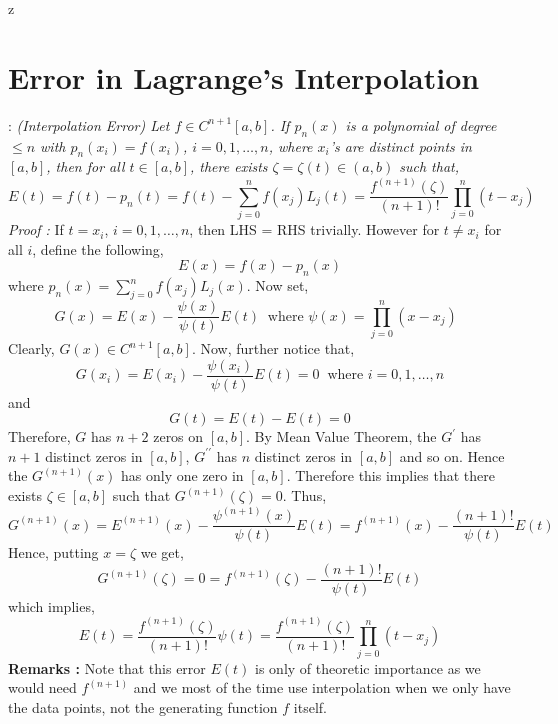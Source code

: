 z\documentclass[a4paper,12pt,twoside]{book}
\newcommand{\nll}[0]{\newline\newline}
\newcommand{\tit}[1]{\textit{#1}}
\newcommand{\theor}[1]{\boxed{\textbf{\textit{Theorem \thechapter.#1}}}}
\begin{document}
\section{Error in Lagrange's Interpolation}
\theor{6}  : \tit{(Interpolation Error) Let $f\in C^{n+1}[a,b]$. If $p_n(x)$ is a polynomial of degree $\le n$ with $p_n(x_i) = f(x_i)$, $i = 0,1,\dots,n$, where $x_i$'s are distinct points in $[a,b]$, then for all $t \in [a,b]$, there exists $\zeta = \zeta(t) \in (a,b)$ such that,
\[ E(t) = f(t) - p_n(t) = f(t) - \sum_{j=0}^{n}f(x_j)L_j(t) = \boxed{\frac{f^{(n+1)}(\zeta)}{(n+1)!} \prod_{j=0}^{n}(t-x_j)} \]
}
\tit{Proof : }If $t = x_i$, $i=0,1,\dots,n$, then LHS = RHS trivially. However for $t \neq x_i$ for all $i$, define the following,
\[ E(x) = f(x) - p_n(x)\]
where $p_n(x) = \sum_{j=0}^nf(x_j)L_j(x)$.
\nll
Now set,
\[ G(x) = E(x) - \frac{\psi(x)}{\psi(t)}E(t) \;\;\text{where } \psi(x) = \prod_{j=0}^n (x-x_j)\;\;\]
Clearly, $G(x) \in C^{n+1}[a,b]$.
\nll
Now, further notice that,
\[ G(x_i) = E(x_i) - \frac{\psi(x_i)}{\psi(t)}E(t) = 0 \;\;\text{where }i=0,1,\dots,n\]
and 
\[ G(t) =  E(t) - E(t) = 0\]
Therefore, $G$ has $n+2$ zeros on $[a,b]$. By Mean Value Theorem, the $G^\prime$ has $n+1$ distinct zeros in $[a,b]$, $G^{\prime\prime}$ has $n$ distinct zeros in $[a,b]$ and so on. Hence the $G^{(n+1)}(x)$ has only one zero in $[a,b]$. Therefore this implies that there exists $\zeta \in [a,b]$ such that $G^{(n+1)}(\zeta) = 0$. Thus,
\[G^{(n+1)}(x) = E^{(n+1)}(x) - \frac{\psi^{(n+1)}(x)}{\psi(t)}E(t) = f^{(n+1)}(x) - \frac{(n+1)!}{\psi(t)}E(t)\]
Hence, putting $x = \zeta$ we get,
\[ G^{(n+1)}(\zeta) = 0 = f^{(n+1)}(\zeta) - \frac{(n+1)!}{\psi(t)}E(t) \]
which implies,
\[E(t) = \frac{f^{(n+1)}(\zeta)}{(n+1)!}\psi(t) = \frac{f^{(n+1)}(\zeta)}{(n+1)!} \prod_{j=0}^{n}(t-x_j)\]
\textbf{Remarks : } Note that this error $E(t)$ is only of theoretic importance as we would need $f^{(n+1)}$ and we most of the time use interpolation when we only have the data points, not the generating function $f$ itself.
\end{document}
